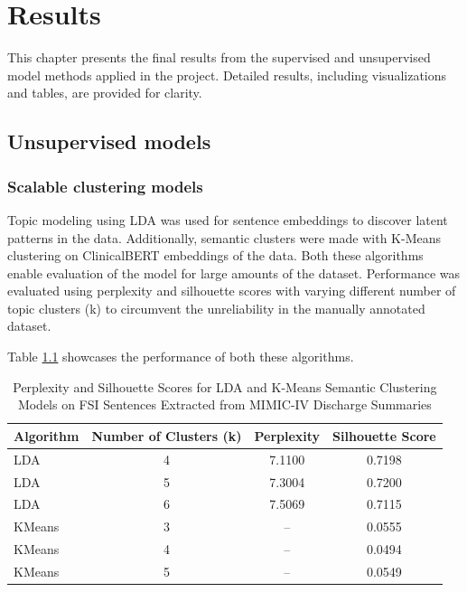 \chapter{Results}

This chapter presents the final results from the supervised and unsupervised model methods applied in the project. Detailed results, including visualizations and tables, are provided for clarity.

\section{Unsupervised models}

\subsection{Scalable clustering models}

Topic modeling using LDA was used for sentence embeddings to discover latent patterns in the data. Additionally, semantic clusters were made with K-Means clustering on ClinicalBERT embeddings of the data. Both these algorithms enable evaluation of the model for large amounts of the dataset. Performance was evaluated using perplexity and silhouette scores with varying different number of topic clusters (k) to circumvent the unreliability in the manually annotated dataset.

Table \ref{tab:lda-kmeans-results} showcases the performance of both these algorithms.
\begin{table}[H]
\centering
\caption{Perplexity and Silhouette Scores for LDA and K-Means Semantic Clustering Models on FSI Sentences Extracted from MIMIC-IV Discharge Summaries}
\label{tab:lda-kmeans-results}
\begin{tabular}{lccc}
\toprule
\textbf{Algorithm} & \textbf{Number of Clusters (k)} & \textbf{Perplexity} & \textbf{Silhouette Score} \\
\midrule
LDA & 4 & 7.1100 & 0.7198 \\[0.5ex]
LDA & 5 & 7.3004 & 0.7200 \\[0.5ex]
LDA & 6 & 7.5069 & 0.7115 \\[0.5ex]
KMeans & 3 & -- & 0.0555 \\[0.5ex]
KMeans & 4 & -- & 0.0494 \\[0.5ex]
KMeans & 5 & -- & 0.0549 \\
\bottomrule
\end{tabular}
\end{table}

